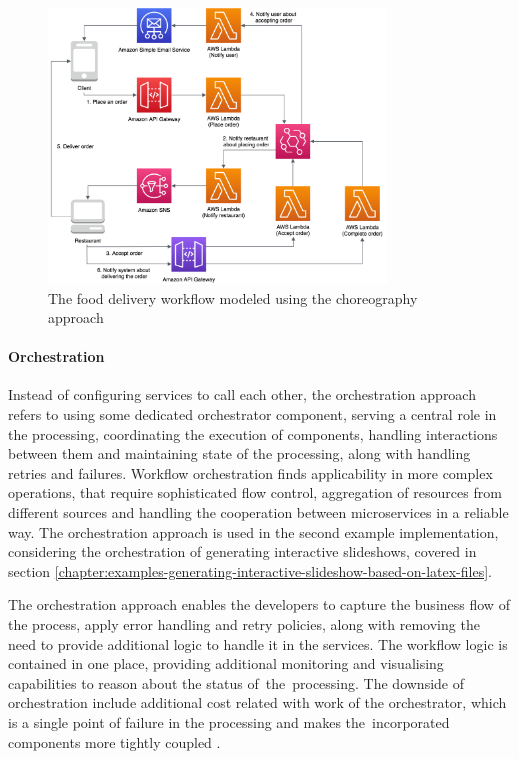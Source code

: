 \begin{figure}[H]
   \centering
   \includegraphics[width=0.8\textwidth]{assets/04-serverless-for-web-apps/choreography.png}
   \caption{The food delivery workflow modeled using the choreography approach}
   \label{fig:choreography-diagram}
\end{figure}

\paragraph{Orchestration}

Instead of configuring services to call each other, the orchestration approach refers to using some dedicated orchestrator component, serving a central role in the processing, coordinating the execution of components, handling interactions between them and maintaining state of the processing, along with handling retries and failures.
Workflow orchestration finds applicability in more complex operations, that require sophisticated flow control, aggregation of resources from different sources and handling the cooperation between microservices in a reliable way.
The orchestration approach is used in the second example implementation, considering the orchestration of generating interactive slideshows, covered in section \ref{chapter:examples-generating-interactive-slideshow-based-on-latex-files}.

The orchestration approach enables the developers to capture the business flow of the process, apply error handling and retry policies, along with removing the need to provide additional logic to handle it in the services.
The workflow logic is contained in one place, providing additional monitoring and visualising capabilities to reason about the status of~the~processing.
The downside of orchestration include additional cost related with work of the orchestrator, which is a single point of failure in the processing and makes the~incorporated components more tightly coupled \cite{ChoreographyVsOrchestrationInServerlessMicroservices}.

